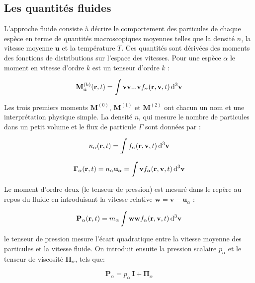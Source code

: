 \begin{refsection}
\subsection{Les quantités fluides}
L'approche fluide consiste à décrire le comportement des particules de chaque
espèce en terme de quantités macroscopiques moyennes telles que la densité $n$,
la vitesse moyenne $\mathbf u$ et la température $T$. Ces quantités sont dérivées
des moments des fonctions de distributions sur l'espace des vitesses.
Pour une espèce $\alpha$ le moment en vitesse d'ordre $k$ est un tenseur d'ordre
$k$ :

\begin{equation}
\mathbf M^{(k)}_\alpha(\mathbf
r,t)=\int\mathbf{v} \mathbf{v} . . .
\mathbf{v} f_\alpha(\mathbf r,\mathbf v,t)
\,\text{d}^{{3}}\mathbf{v}
\end{equation}

Les trois premiers moments $\mathbf M^{(0)}$, $\mathbf M^{(1)}$ et $\mathbf
M^{(2)}$ ont chacun un nom et une interprétation physique simple. La densité $n$, qui
mesure le nombre de particules dans un petit volume et le flux de particule
$\Gamma$ sont données par :

\begin{equation}
n_\alpha(\mathbf
r,t)=\int f_\alpha(\mathbf r,\mathbf v,t)
\,\text{d}^{{3}}\mathbf{v}
\end{equation}

\begin{equation}
\boldsymbol{\Gamma}_\alpha(\mathbf
r,t)=n_\alpha\mathbf u_\alpha=\int \mathbf v f_\alpha(\mathbf r,\mathbf
v,t) \,\text{d}^{{3}}\mathbf{v}
\end{equation}

Le moment d'ordre deux (le tenseur de pression) est mesuré dans le repère au
repos du fluide en introduisant la vitesse relative $\mathbf w=\mathbf
v-\mathbf u_\alpha$ : 

\begin{equation}
\mathbf P_\alpha(\mathbf
r,t)=m_\alpha\int \mathbf w\mathbf w
f_\alpha(\mathbf r,\mathbf v,t) \,\text{d}^{{3}}\mathbf{v}
\end{equation}

le tenseur de pression mesure l'écart quadratique entre la vitesse moyenne des
particules et la vitesse fluide. On introduit ensuite la
pression scalaire $p_\alpha$ et le tenseur de viscosité
$\boldsymbol{\Pi}_\alpha$, tels que:

\begin{equation}
\label{1-tenseurPression}
\mathbf P_\alpha=p_\alpha\,\mathbf I + \boldsymbol{\Pi}_\alpha
\end{equation}


\end{refsection}
